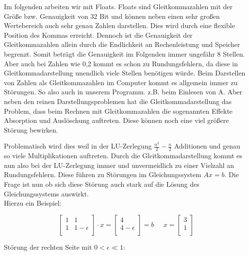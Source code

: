\documentclass[course=erap]{aspdoc}
\begin{document}
Im folgenden arbeiten wir mit Floats. Floats sind Gleitkommazahlen mit der Größe 
bzw. Genauigkeit von 32 Bit und können neben einen sehr großen Wertebereich auch 
sehr genau Zahlen darstellen. Dies wird durch eine flexible Position des Kommas erreicht.
 Dennoch ist die Genauigkeit der Gleitkommazahlen allein durch die Endlichkeit an 
Rechenleistung und Speicher begrenzt. Somit beträgt die 
Genauigkeit im Folgenden immer ungefähr 8 Stellen. Aber auch bei Zahlen wie 
0,2 kommt es schon zu Rundungsfehlern, da diese in Gleitkommadarstellung unendlich 
viele Stellen benötigen würde. Beim Darstellen von Zahlen als Gleitkommazahlen im Computer
 kommt es allgemein immer zu Störungen. So also auch in unserem Programm. z.B. beim Einlesen von A.
Aber neben den reinen Darstellungsproblemen hat die Gleitkommadarstellung das Problem, dass beim Rechnen mit 
Gleitkommazahlen die sogenannten Effekte Absorption und Auslöschung auftreten. Diese können noch eine viel größere Störung bewirken.

Problematisch wird dies weil in der LU-Zerlegung $\frac{n^2}{2} - \frac{n}{2} $
Additionen und genau so viele Multiplikationen auftreten\cite{LUGenauigkeit}.
Durch die Gleitkommadarstellung kommt es nun also bei der LU-Zerlegung immer und 
unvermeidlich zu einer Vielzahl an Rundungsfehlern.
Diese führen zu Störungen im Gleichungssystem $Ax=b$. Die Frage ist nun ob sich diese 
Störung auch stark auf die Lösung des Gleichungssystems auswirkt.\\

Hierzu ein Beispiel:

\begin{equation}
\label{absBeis}
 \begin{bmatrix}
 1	& 1	 \\
 1	& 1-\epsilon\\

 \end{bmatrix}
 \cdot x = 
  \begin{bmatrix}
 4 \\
 4- \epsilon\\

 \end{bmatrix}
  = b\;\;\;\;\;
  x = 
  \begin{bmatrix}
 3 \\
 1\\
\end{bmatrix}
\end{equation}

Störung der rechten Seite mit $ 0 < \epsilon \ll 1$:
\end{document}
